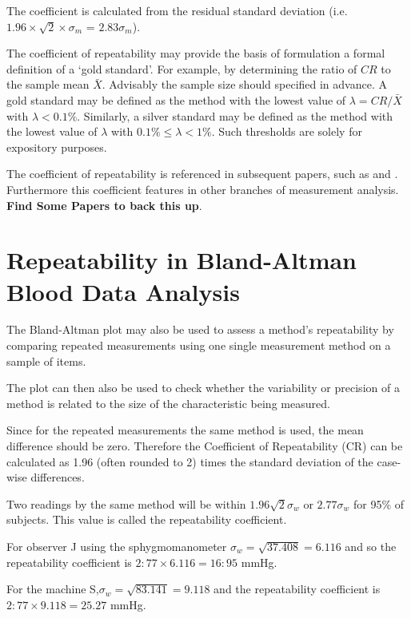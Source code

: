 \documentclass[12pt, a4paper]{report}
\theoremstyle{plain}
\theoremstyle{definition}
\theoremstyle{remark}
\begin{document}
	
	 The coefficient is calculated from the residual standard deviation (i.e. $1.96 \times \sqrt{2} \times \sigma_m$ = $2.83 \sigma_m$).
	

	


	
	
	The coefficient of repeatability may provide the basis of formulation a formal definition of a `gold standard'. For example, by determining the ratio of $CR$ to the sample mean $\bar{X}$. Advisably the sample size should specified in advance. A gold standard may be defined as the method with the lowest value of $\lambda = CR /\bar{X}$ with $\lambda < 0.1\%$. Similarly, a silver standard may be defined as the method with the lowest value of $\lambda $ with $0.1\% \leq \lambda < 1\%$. Such thresholds are solely for expository purposes.
	
	
The coefficient of repeatability is referenced in subsequent papers, such as \citet{BXC2008} and \citet{ARoy2009}. Furthermore this coefficient features in other branches of measurement analysis. 
\textbf{Find Some Papers to back this up}.

\section{Repeatability in Bland-Altman Blood Data Analysis}

The Bland-Altman plot may also be used to assess a method's repeatability by comparing repeated measurements using one single measurement method on a sample of items.

The plot can then also be used to check whether the variability or precision of a method is related to the size of the characteristic being measured.

Since for the repeated measurements the same method is used, the mean difference should be zero.
Therefore the Coefficient of Repeatability (CR) can be calculated as 1.96 (often rounded to 2) times the standard deviation of the case-wise differences.


 Two readings by the same method will be within $1.96
		\sqrt{2} \sigma_w $ or $2.77 \sigma_w $ for 95\% of subjects. This value is called the repeatability coefficient.
		
		For observer J using the sphygmomanometer $ \sigma_w = \sqrt{37.408} = 6.116$ and so the repeatability coefficient is
		$2:77 \times 6.116 = 16:95$ mmHg.
		
		 For the machine S,$ \sigma_w = \sqrt{83.141} = 9.118$ and the repeatability coefficient is $2:77 \times 9.118 = 25.27$ mmHg.
		
	
	
	
	
	
	
\end{document}

